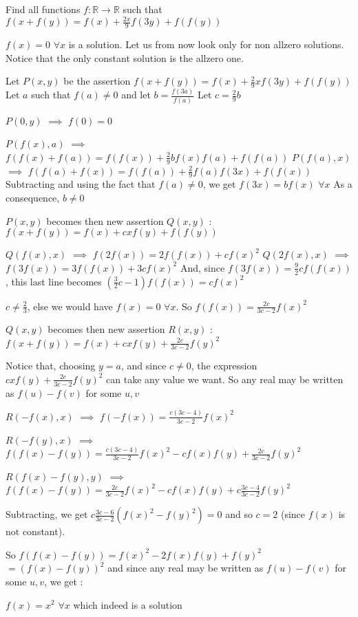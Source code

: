 \begin{solution}
	\begin{tcolorbox}Find all functions  $ f: \mathbb{R}\rightarrow \mathbb{R} $ such that  $f(x+f(y))=f(x)+\frac{2x}{9}f(3y)+f(f(y)) $\end{tcolorbox}
$\boxed{f(x)=0}$ $\forall x$ is a solution.
Let us from now look only for non allzero solutions.
Notice that the only constant solution is the allzero one.

Let $P(x,y)$ be the assertion $f(x+f(y))=f(x)+\frac 29xf(3y)+f(f(y))$
Let $a$ such that $f(a)\ne 0$ and let $b=\frac{f(3a)}{f(a)}$
Let $c=\frac 29b$

$P(0,y)$ $\implies$ $f(0)=0$

$P(f(x),a)$ $\implies$ $f(f(x)+f(a))=f(f(x))+\frac 29bf(x)f(a)+f(f(a))$
$P(f(a),x)$ $\implies$ $f(f(a)+f(x))=f(f(a))+\frac 29f(a)f(3x)+f(f(x))$
Subtracting and using the fact that $f(a)\ne 0$, we get $f(3x)=bf(x)$ $\forall x$
As a consequence, $b\ne 0$

$P(x,y)$ becomes then new assertion $Q(x,y)$ : $f(x+f(y))=f(x)+cxf(y)+f(f(y))$

$Q(f(x),x)$ $\implies$ $f(2f(x))=2f(f(x))+cf(x)^2$
$Q(2f(x),x)$ $\implies$ $f(3f(x))=3f(f(x))+3cf(x)^2$
And, since $f(3f(x))=\frac 92cf(f(x))$, this last line becomes $(\frac 32c-1)f(f(x))=cf(x)^2$

$c\ne \frac 23$, else we would have $f(x)=0$ $\forall x$. So $f(f(x))=\frac{2c}{3c-2}f(x)^2$

$Q(x,y)$ becomes then new assertion $R(x,y)$ : $f(x+f(y))=f(x)+cxf(y)+\frac{2c}{3c-2}f(y)^2$

Notice that, choosing $y=a$, and since $c\ne 0$, the expression $cxf(y)+\frac{2c}{3c-2}f(y)^2$ can take any value we want.
So any real may be written as $f(u)-f(v)$ for some $u,v$

$R(-f(x),x)$ $\implies$ $f(-f(x))=\frac{c(3c-4)}{3c-2}f(x)^2$

$R(-f(y),x)$ $\implies$ $f(f(x)-f(y))=\frac{c(3c-4)}{3c-2}f(x)^2-cf(x)f(y)+\frac{2c}{3c-2}f(y)^2$

$R(f(x)-f(y),y)$ $\implies$ $f(f(x)-f(y))=\frac{2c}{3c-2}f(x)^2-cf(x)f(y)+c\frac{3c-4}{3c-2}f(y)^2$

Subtracting, we get $c\frac{3c-6}{3c-2}(f(x)^2-f(y)^2)=0$ and so $c=2$ (since $f(x)$ is not constant).

So $f(f(x)-f(y))=f(x)^2-2f(x)f(y)+f(y)^2$ $=(f(x)-f(y))^2$ and since any real may be written as $f(u)-f(v)$ for some $u,v$, we get :

$\boxed{f(x)=x^2}$ $\forall x$ which indeed is a solution
\end{solution}



